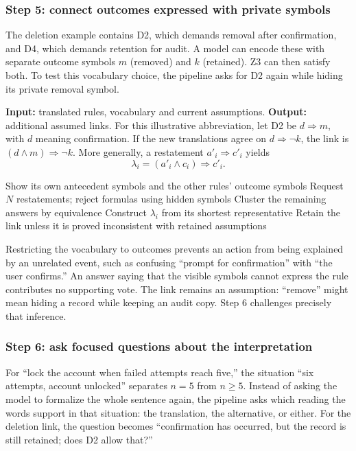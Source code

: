 \subsubsection{Step 5: connect outcomes expressed with private symbols}
The deletion example contains D2, which demands removal after confirmation,
and D4, which demands retention for audit. A model can encode these with
separate outcome symbols $m$ (removed) and $k$ (retained). Z3 can then
satisfy both. To test this vocabulary choice, the pipeline asks for D2
again while hiding its private removal symbol.

\textbf{Input:} translated rules, vocabulary and current assumptions.
\textbf{Output:} additional assumed links. For this illustrative
abbreviation, let D2 be $d\Rightarrow m$, with $d$ meaning confirmation.
If the new translations agree on $d\Rightarrow\neg k$, the link is
$(d\land m)\Rightarrow\neg k$. More generally, a restatement
$a'_i\Rightarrow c'_i$ yields
\[
 \lambda_i=(a'_i\land c_i)\Rightarrow c'_i.
\]

\begin{algorithm}[H]
\caption{Restate private outcomes and record links}\label{alg:links}
\begin{algorithmic}[1]
  \State Show its own antecedent symbols and the other rules' outcome symbols
  \State Request $N$ restatements; reject formulas using hidden symbols
  \State Cluster the remaining answers by equivalence
    \State Construct $\lambda_i$ from its shortest representative
    \State Retain the link unless it is proved inconsistent with retained assumptions
  \EndIf
\EndFor
\end{algorithmic}
\end{algorithm}

Restricting the vocabulary to outcomes prevents an action from being
explained by an unrelated event, such as confusing ``prompt for
confirmation'' with ``the user confirms.'' An answer saying that the
visible symbols cannot express the rule contributes no supporting vote.
The link remains an assumption: ``remove'' might mean hiding a record
while keeping an audit copy. Step 6 challenges precisely that inference.

\subsubsection{Step 6: ask focused questions about the interpretation}
For ``lock the account when failed attempts reach five,'' the situation
``six attempts, account unlocked'' separates $n=5$ from $n\ge5$.
Instead of asking the model to formalize the whole sentence again, the
pipeline asks which reading the words support in that situation: the
translation, the alternative, or either. For the deletion link, the
question becomes ``confirmation has occurred, but the record is still
retained; does D2 allow that?''

